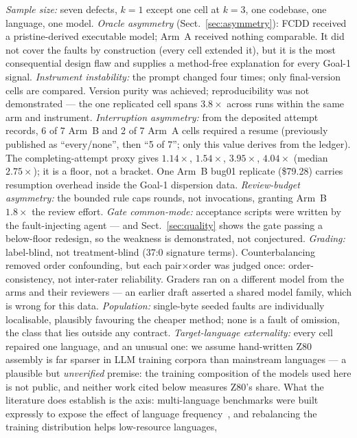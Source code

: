 \documentclass[runningheads]{llncs}
\begin{document}
\emph{Sample size:} seven defects, $k=1$ except one cell at $k=3$, one
codebase, one language, one model.
\emph{Oracle asymmetry} (Sect.~\ref{sec:asymmetry}): FCDD received a
pristine-derived executable model; Arm~A received nothing comparable. It did
not cover the faults by construction (every cell extended it), but it is the
most consequential design flaw and supplies a method-free explanation for
every Goal-1 signal.
\emph{Instrument instability:} the prompt changed four times; only
final-version cells are compared. Version purity was achieved;
reproducibility was not demonstrated --- the one replicated cell spans
$3.8\times$ across runs within the same arm and instrument.
\emph{Interruption asymmetry:} from the deposited attempt records, 6 of 7
Arm~B and 2 of 7 Arm~A cells required a resume (previously published as
``every/none'', then ``5 of 7''; only this value derives from the ledger).
The completing-attempt proxy gives $1.14\times$, $1.54\times$, $3.95\times$,
$4.04\times$ (median $2.75\times$); it is a floor, not a bracket. One Arm~B
bug01 replicate (\$79.28) carries resumption overhead inside the Goal-1
dispersion data.
\emph{Review-budget asymmetry:} the bounded rule caps rounds, not
invocations, granting Arm~B $1.8\times$ the review effort.
\emph{Gate common-mode:} acceptance scripts were written by the
fault-injecting agent --- and Sect.~\ref{sec:quality} shows the gate passing
a below-floor redesign, so the weakness is demonstrated, not conjectured.
\emph{Grading:} label-blind, not treatment-blind (37:0 signature terms).
Counterbalancing removed order confounding, but each pair$\times$order was
judged once: order-consistency, not inter-rater reliability. Graders ran on a
different model from the arms and their reviewers --- an earlier draft
asserted a shared model family, which is wrong for this data.
\emph{Population:} single-byte seeded faults are individually localisable,
plausibly favouring the cheaper method; none is a fault of omission, the
class that lies outside any contract.
\emph{Target-language externality:} every cell repaired one language, and
an unusual one: we assume hand-written Z80 assembly is far sparser in LLM
training corpora than mainstream languages --- a plausible but
\emph{unverified} premise: the training composition of the models used here
is not public, and neither work cited below measures Z80's share. What the
literature does establish is the axis: multi-language benchmarks were built
expressly to expose the effect of language frequency~\cite{cassano2022},
and rebalancing the training distribution helps low-resource languages,
\end{document}
